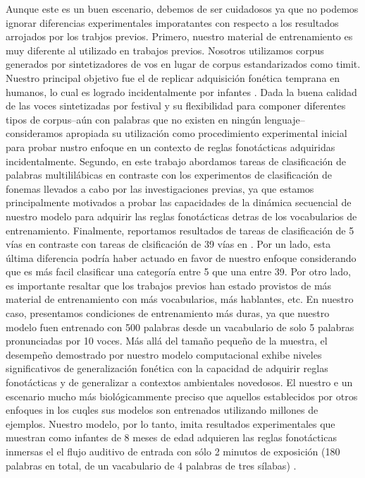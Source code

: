 Aunque este es un buen escenario, debemos de ser cuidadosos ya que no podemos ignorar diferencias experimentales imporatantes con respecto a los resultados arrojados por los trabjos previos. Primero, nuestro material de entrenamiento es muy diferente  al utilizado en trabajos previos. Nosotros utilizamos corpus generados por sintetizadores de vos en lugar de corpus estandarizados como \gls{timit}.
Nuestro principal objetivo fue el de replicar adquisición fonética temprana en humanos, lo cual es logrado incidentalmente por infantes \cite{Saffran1996StatisticalLB}.
Dada la buena calidad de las voces sintetizadas por \gls{festival}  \cite{festival2014} y su flexibilidad para componer diferentes tipos de corpus--aún con palabras que no existen en ningún lenguaje--consideramos apropiada su utilización como procedimiento experimental inicial para probar nustro enfoque en un contexto de reglas fonotácticas adquiridas incidentalmente.
Segundo, en este trabajo abordamos tareas de clasificación de palabras multililábicas en contraste con los experimentos de clasificación de fonemas llevados a cabo por las investigaciones previas, ya que estamos principalmente motivados a probar las capacidades de la dinámica secuencial de nuestro modelo para adquirir las reglas fonotácticas detras de los vocabularios de entrenamiento.
Finalmente, reportamos resultados de tareas de clasificación de 5 vías en contraste con tareas de clsificación de 39 vías en \cite{Lee:2009:UFL:2984093.2984217}.
Por un lado, esta última diferencia podría haber actuado en favor de nuestro enfoque considerando que es más facil clasificar una categoría entre 5 que una entre 39.
Por otro lado, es importante resaltar que los trabajos previos han estado provistos de más material de entrenamiento con más vocabularios, más hablantes, etc.
En nuestro caso, presentamos condiciones de entrenamiento más duras, ya que nuestro modelo fuen entrenado con 500 palabras desde un vacabulario de solo 5 palabras pronunciadas por 10 voces.
Más allá del tamaño pequeño de la muestra, el desempeño demostrado por nuestro modelo computacional exhibe niveles significativos de generalización fonética con la capacidad de adquirir reglas fonotácticas y de generalizar a contextos ambientales novedosos. El nuestro e un escenario mucho más biológicammente preciso que aquellos establecidos por otros enfoques in los cuqles sus modelos son entrenados utilizando millones de ejemplos. Nuestro modelo, por lo tanto, imita resultados experimentales que muestran como infantes de 8 meses de edad adquieren las reglas fonotácticas inmersas el el flujo auditivo de entrada con sólo 2 minutos de exposición (180 palabras en total, de un vacabulario de 4 palabras de tres sílabas) \cite{Saffran1996StatisticalLB}.

